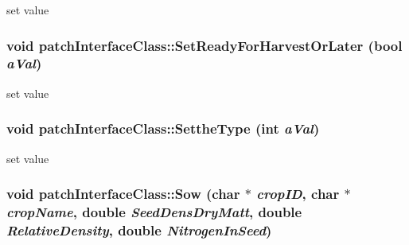 set value \hypertarget{classpatch_interface_class_ad7871fad5ade318db9122ee3b6069ea0}{
\subsubsection[{SetReadyForHarvestOrLater}]{\setlength{\rightskip}{0pt plus 5cm}void patchInterfaceClass::SetReadyForHarvestOrLater (bool {\em aVal})}}
\label{classpatch_interface_class_ad7871fad5ade318db9122ee3b6069ea0}


set value \hypertarget{classpatch_interface_class_a2be7164993aef326ceb9678a0363dc4a}{
\subsubsection[{SettheType}]{\setlength{\rightskip}{0pt plus 5cm}void patchInterfaceClass::SettheType (int {\em aVal})}}
\label{classpatch_interface_class_a2be7164993aef326ceb9678a0363dc4a}


set value \hypertarget{classpatch_interface_class_a1d4ab5a278d6663260d75d2c3c7ddb6b}{
\subsubsection[{Sow}]{\setlength{\rightskip}{0pt plus 5cm}void patchInterfaceClass::Sow (char $\ast$ {\em cropID}, \/  char $\ast$ {\em cropName}, \/  double {\em SeedDensDryMatt}, \/  double {\em RelativeDensity}, \/  double {\em NitrogenInSeed})}}
\label{classpatch_interface_class_a1d4ab5a278d6663260d75d2c3c7ddb6b}


